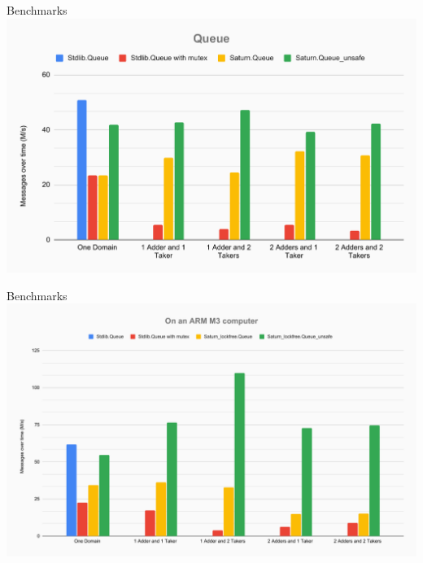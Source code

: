 
  \begin{frame}{Benchmarks}
    \centering\includegraphics[width=0.9\linewidth]{images/Queue.pdf}
 \end{frame}


 \begin{frame}{Benchmarks}
    \centering\includegraphics[width=0.9\linewidth]{images/vesa_computer.pdf}
 \end{frame}
